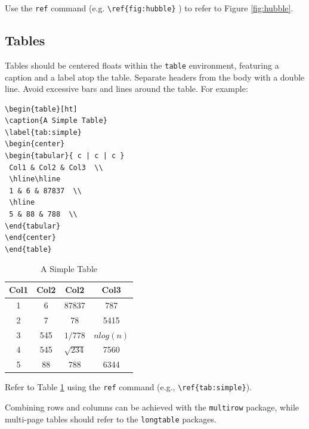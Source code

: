 \documentclass{frccs2024}
\begin{document}
Use the \texttt{ref} command (e.g. \texttt{\textbackslash ref\{fig:hubble\}} ) to refer to Figure \ref{fig:hubble}. 


\subsection{Tables}

Tables should be centered floats within the \texttt{table} environment, featuring a caption and a label atop the table. Separate headers from the body with a double line. Avoid excessive bars and lines around the table. For example:

\begin{verbatim}
\begin{table}[ht]
\caption{A Simple Table}
\label{tab:simple}
\begin{center}
\begin{tabular}{ c | c | c }
 Col1 & Col2 & Col3  \\
 \hline\hline
 1 & 6 & 87837  \\
 \hline
 5 & 88 & 788  \\
\end{tabular}
\end{center}
\end{table}
\end{verbatim}

\begin{table}[ht]
\caption{A Simple Table}\label{tab:simple}
\begin{center}
\begin{tabular}{ c | c | c | c } 

 Col1 & Col2 & Col2 & Col3 \\ 
 \hline\hline 
 1 & 6 & 87837 & 787 \\ 
 \hline
 2 & 7 & 78 & 5415 \\
 \hline
 3 & 545 & $1/778$ & $n log(n)$ \\
 \hline
 4 & 545 & $\sqrt{234}$ & 7560 \\
 \hline
 5 & 88 & 788 & 6344 \\
\end{tabular}
\end{center}
\end{table}

Refer to Table \ref{tab:simple} using the \texttt{ref} command (e.g., \texttt{\textbackslash ref\{tab:simple\}}).

Combining rows and columns can be achieved with the \texttt{multirow} package, while multi-page tables should refer to the \texttt{longtable} packages. 
\end{document}
